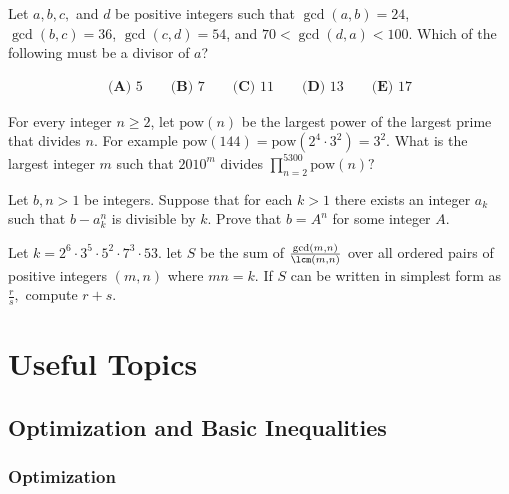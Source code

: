 \documentclass[blue,onecol]{shooting}
\begin{document}
\begin{prob}[AMC 10A 2018/22]{9}
Let $a, b, c,$ and $d$ be positive integers such that $\gcd(a, b)=24$, $\gcd(b, c)=36$, $\gcd(c, d)=54$, and $70<\gcd(d, a)<100$. Which of the following must be a divisor of $a$?

\begin{align*}\textbf{(A)} \text{ 5} \qquad \textbf{(B)} \text{ 7} \qquad \textbf{(C)} \text{ 11} \qquad \textbf{(D)} \text{ 13} \qquad \textbf{(E)} \text{ 17}\end{align*}


\end{prob}

\begin{prob}[AMC 12B 2010/25]{9}
For every integer $n\ge2$, let $\text{pow}(n)$ be the largest power of the largest prime that divides $n$. For example $\text{pow}(144)=\text{pow}(2^4\cdot3^2)=3^2$. What is the largest integer $m$ such that $2010^m$ divides $\prod\limits_{n=2}^{5300}\text{pow}(n)?$
\end{prob}

\begin{prob}[ISL 2007/N2]{13}
Let $b,n > 1$ be integers. Suppose that for each $k > 1$ there exists an integer $a_k$ such that $b - a^n_k$ is divisible by $k$. Prove that $b = A^n$ for some integer $A$.
\end{prob}

\begin{prob}[PUMaC 2016]{13}
Let $k=2^6\cdot 3^5\cdot 5^2\cdot 7^3\cdot 53.$ let $S$ be the sum of $\frac{\gcd(m,n)}{\lcm(m,n)}$ over all ordered pairs of positive integers $(m,n)$ where $mn=k.$ If $S$ can be written in simplest form as $\frac{r}{s},$ compute $r+s.$
\end{prob}

\part{Useful Topics}

\chapter{Optimization and Basic Inequalities}











\section{Optimization}
\end{document}
